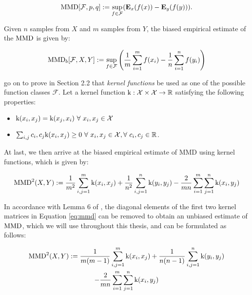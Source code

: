 \begin{equation}
  \label{eq:mmd_general}
  \text{MMD}[\mathcal{F},p,q]:=\sup_{f\in\mathcal{F}}(\mathbf{E}_x(f(x))-\mathbf{E}_y(f(y))).
\end{equation}

Given $n$ samples from $X$ and $m$ samples from $Y$, the biased empirical estimate
of the $\text{MMD}$ is given by:

\begin{equation}
  \label{eq:mmd_estimate}
  \text{MMD}_b[\mathcal{F},X,Y]:=\sup_{f\in\mathcal{F}}\left({1\over m}\sum_{i=1}^{m}f(x_i)-{1\over n}\sum_{i=1}^{n}f(y_i)\right)
\end{equation}

\cite{gretton2012kernel} go on to prove in Section 2.2 that \emph{kernel
functions} be used as one of the possible function classes $\mathcal{F}$. Let a
kernel function $\text{k}:\mathcal{X}\times \mathcal{X}\to\mathbb{R} $ satisfying the
following properties:

\begin{itemize}
\item $\tk(x_i,x_j)=\tk(x_j,x_i)\ \forall\ x_i,x_j\in\mathcal{X}$
\item $\sum_{i,j}c_i,c_j\tk(x_i,x_j)\geq 0\ \forall\ x_i,x_j\in\mathcal{X},
  \forall\ c_i,c_j\in\R$.
\end{itemize}

At last, we then arrive at the biased empirical estimate of MMD using kernel
functions, which is given by:

\begin{equation}
  \label{eq:mmd}
  \text{MMD}^2(X,Y) := {1\over m^2}\sum_{i,j=1}^m\text{k}(x_i, x_j) + {1\over n^2}\sum_{i,j=1}^n\text{k}(y_i,y_j) - {2\over mn}\sum_{i=1}^{m}\sum_{j=1}^{n}\text{k} (x_i,y_j)
\end{equation}

In accordance with Lemma 6 of \cite{gretton2012kernel}, the diagonal elements of
the first two kernel matrices in Equation \ref{eq:mmd} can be removed to
obtain an unbiased estimate of $\text{MMD}$, which we will use throughout this thesis,
and can be formulated as follows:

\begin{multline}
  \label{eq:mmd_unbiased}
  \text{MMD}^2(X,Y) := {1\over m(m-1)}\sum_{i,j=1}^m\text{k}(x_i, x_j) + {1\over n(n-1)}\sum_{i,j=1}^n\text{k}(y_i,y_j)\\ - {2\over mn}\sum_{i=1}^{m}\sum_{j=1}^{n}\text{k} (x_i,y_j)
\end{multline}

